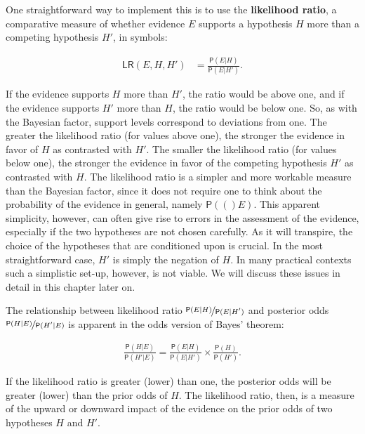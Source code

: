 \documentclass[10pt,dvipsnames,enabledeprecatedfontcommands]{scrartcl}
\newcommand{\pr}[1]{\mathsf{P}(#1)}
\begin{document}
One straightforward way to implement this is to use the
\textbf{likelihood ratio}, a comparative measure of whether evidence
\(E\) supports a hypothesis \(H\) more than a competing hypothesis
\(H'\), in symbols:

\begin{align}
\label{eq:LR}
\mathsf{LR}(E,H,H') & = \frac{\pr{E \vert H}}{\pr{E \vert H'}}.
\end{align}

If the evidence supports \(H\) more than \(H'\), the ratio would be
above one, and if the evidence supports \(H'\) more than \(H\), the
ratio would be below one. So, as with the Bayesian factor, support
levels correspond to deviations from one. The greater the likelihood
ratio (for values above one), the stronger the evidence in favor of
\(H\) as contrasted with \(H'\). The smaller the likelihood ratio (for
values below one), the stronger the evidence in favor of the competing
hypothesis \(H'\) as contrasted with \(H\). The likelihood ratio is a
simpler and more workable measure than the Bayesian factor, since it
does not require one to think about the probability of the evidence in
general, namely \(\pr(E)\). This apparent simplicity, however, can often
give rise to errors in the assessment of the evidence, especially if the
two hypotheses are not chosen carefully. As it will transpire, the
choice of the hypotheses that are conditioned upon is crucial. In the
most straightforward case, \(H'\) is simply the negation of \(H\). In
many practical contexts such a simplistic set-up, however, is not
viable. We will discuss these issues in detail in this chapter later on.

The relationship between likelihood ratio
\(\nicefrac{\pr{E \vert H}}{\pr{E \vert H'}}\) and posterior odds
\(\nicefrac{\pr{H \vert E}}{\pr{H' \vert E}}\) is apparent in the odds
version of Bayes' theorem:

\begin{align}\label{eq:BTodds}
\frac{\pr{H \vert E}}{\pr{H' \vert E}}= \frac{\pr{E \vert H}}{\pr{E \vert H'}}\times \frac{\pr{H}}{\pr{H'}}.
\end{align}

\noindent If the likelihood ratio is greater (lower) than one, the
posterior odds will be greater (lower) than the prior odds of \(H\). The
likelihood ratio, then, is a measure of the upward or downward impact of
the evidence on the prior odds of two hypotheses \(H\) and \(H'\).
\end{document}
